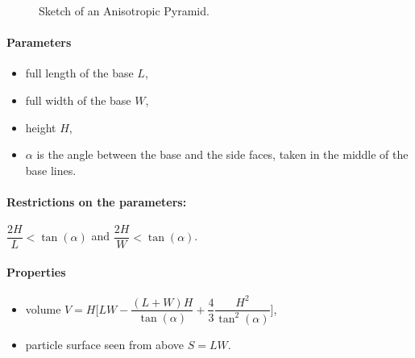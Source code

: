 \begin{figure}[ht]
\hfill
{}
\hfill
{}
\hfill
\caption{Sketch of an Anisotropic Pyramid.}
\label{fig:anisopyramid}
\end{figure}

\FloatBarrier

\paragraph{Parameters}
\begin{itemize}
\item full length of the base $L$,
\item full width of the base $W$,
\item height $H$,
\item $\alpha$ is the angle between the base and the
  side faces, taken in the middle of the base lines.
\end{itemize}

\paragraph{Restrictions on the parameters:} $\dfrac{2H}{L}< \tan(\alpha)$ and $\dfrac{2H}{W}< \tan(\alpha)$.

\paragraph{Properties}
\begin{itemize}
\item volume $V= H \Big[LW - \dfrac{(L + W)H}{\tan(\alpha)}
   + \dfrac{4}{3} \dfrac{H^2}{\tan^2(\alpha)}\Big]$,
\item particle surface seen from above $S = LW$.
\end{itemize}

